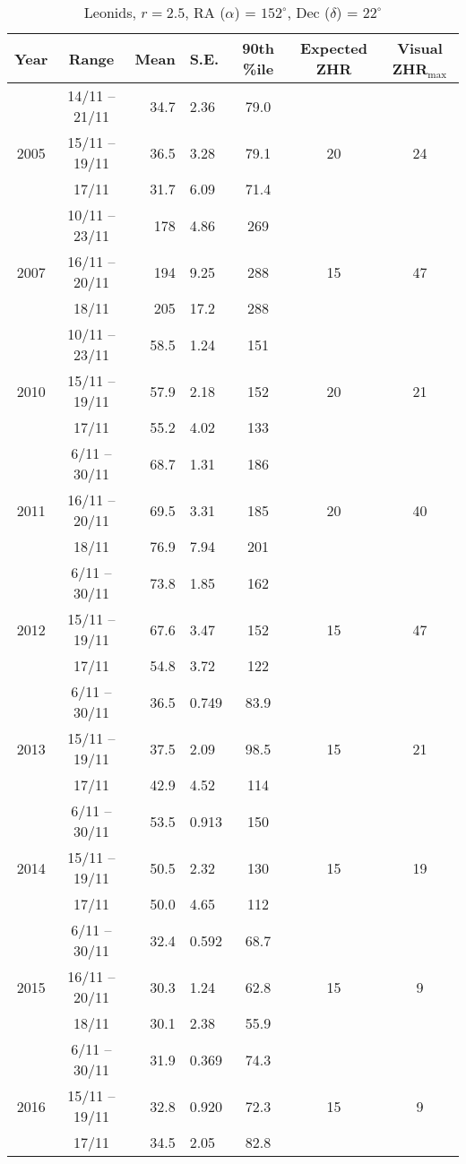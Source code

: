 \begin{table}[h!]
	\centering
	\begin{tabular}{|c|c|r@{ \,$\pm$\, }lc|cc|}
		\hline 
		Year & Range & Mean & S.E. & 90th \%ile & Expected ZHR & Visual ZHR$_{\text{max}}$ \\ 
		\hline
		& 14/11 -- 21/11 & 34.7 & 2.36 & 79.0 & &  \\ 
		2005 & 15/11 -- 19/11& 36.5 & 3.28 & 79.1 & 20 & 24  \\ 
		& 17/11 & 31.7 & 6.09 & 71.4 & &  \\ 
		\hline 
		&10/11 -- 23/11 & 178 & 4.86 & 269 & &  \\
		2007 & 16/11 -- 20/11&	 194 & 9.25 & 288  &15 & 47 \\ 
		& 18/11& 205 & 17.2 & 288  & & \\ 
		\hline 
		& 10/11 -- 23/11& 58.5 & 1.24 & 151 & &  \\ 
		2010 & 15/11 -- 19/11&	 57.9 & 2.18 & 152 & 20 & 21  \\ 
		& 17/11& 55.2 & 4.02 & 133 & &  \\ 
		\hline 
		&6/11 -- 30/11 & 68.7 & 1.31 & 186 & &  \\ 
		2011 &16/11 -- 20/11 & 69.5 & 3.31 & 185 &  20 & 40  \\ 
		& 18/11& 76.9 & 7.94 & 201 & &  \\ 
		\hline 
		&6/11 -- 30/11 & 73.8 & 1.85 & 162 & &  \\ 
		2012 &15/11 -- 19/11 & 67.6 & 3.47 & 152 & 15 & 47  \\ 
		& 17/11& 54.8 & 3.72 & 122 & & \\ 
		\hline 
		&6/11 -- 30/11 & 36.5 & 0.749 & 83.9 & & \\
		2013 &15/11 -- 19/11 & 37.5 & 2.09 & 98.5 & 15 & 21  \\
		& 17/11& 42.9 & 4.52 & 114 & & \\ 
		\hline 
		& 6/11 -- 30/11& 53.5 & 0.913 & 150 & & \\ 
		2014 &15/11 -- 19/11 & 50.5 & 2.32 & 130 & 15 & 19  \\ 
		& 17/11& 50.0 & 4.65 & 112 & & \\ 
		\hline 
		&6/11 -- 30/11 & 32.4 & 0.592 & 68.7  & &  \\ 
		2015 & 16/11 -- 20/11& 30.3 & 1.24 & 62.8  & 15 & 9 \\ 
		& 18/11& 30.1 & 2.38 & 55.9  & & \\ 
		\hline
		&6/11 -- 30/11 & 31.9 & 0.369 & 74.3	& & \\
		2016 &15/11 -- 19/11 & 32.8 & 0.920 & 72.3 & 15 & 9 \\ 
		& 17/11& 34.5 & 2.05 & 82.8 & &  \\ 
		\hline 
	\end{tabular}
\caption{Leonids, $r = 2.5$, RA ($\alpha$) = $152^{\circ}$, Dec ($\delta$) = $22^{\circ}$} 
\end{table}

